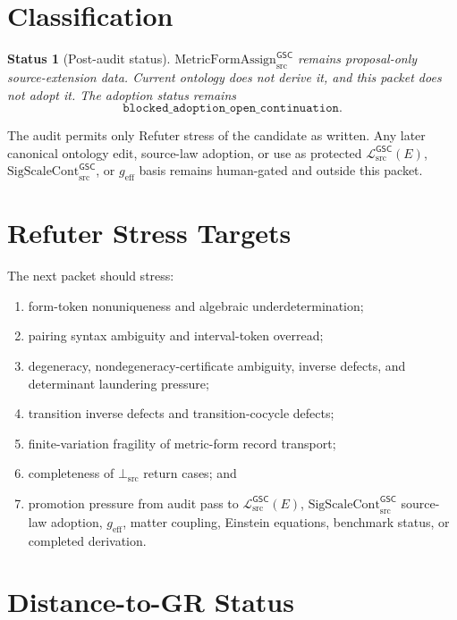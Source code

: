\documentclass[11pt]{article}
\newcommand{\MetricData}{\mathcal{L}_{\mathrm{src}}^{\mathsf{GSC}}}
\newcommand{\geff}{g_{\mathrm{eff}}}
\newcommand{\SigScaleCont}{\mathrm{SigScaleCont}_{\mathrm{src}}^{\mathsf{GSC}}}
\newcommand{\MetricFormAssign}{\mathrm{MetricFormAssign}_{\mathrm{src}}^{\mathsf{GSC}}}
\newcommand{\BottomSrc}{\bot_{\mathrm{src}}}
\newtheorem{status}{Status}
\begin{document}
\section{Classification}

\begin{status}[Post-audit status]
\(\MetricFormAssign\) remains proposal-only source-extension data. Current
ontology does not derive it, and this packet does not adopt it. The adoption
status remains
\[
  \texttt{blocked\_adoption\_open\_continuation}.
\]
\end{status}

The audit permits only Refuter stress of the candidate as written. Any later
canonical ontology edit, source-law adoption, or use as protected
\(\MetricData(E)\), \(\SigScaleCont\), or \(\geff\) basis remains human-gated
and outside this packet.

\section{Refuter Stress Targets}

The next packet should stress:
\begin{enumerate}[leftmargin=*]
  \item form-token nonuniqueness and algebraic underdetermination;
  \item pairing syntax ambiguity and interval-token overread;
  \item degeneracy, nondegeneracy-certificate ambiguity, inverse defects, and
  determinant laundering pressure;
  \item transition inverse defects and transition-cocycle defects;
  \item finite-variation fragility of metric-form record transport;
  \item completeness of \(\BottomSrc\) return cases; and
  \item promotion pressure from audit pass to \(\MetricData(E)\),
  \(\SigScaleCont\) source-law adoption, \(\geff\), matter coupling, Einstein
  equations, benchmark status, or completed derivation.
\end{enumerate}

\section{Distance-to-GR Status}
\end{document}
